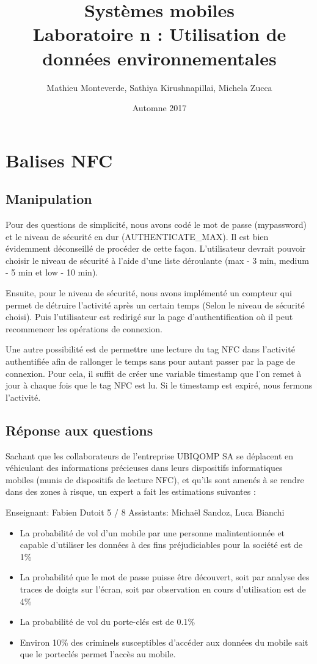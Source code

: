 \documentclass[francais,12pt]{article}
\title{Systèmes mobiles \\ Laboratoire n\textordmasculine3 : Utilisation de données environnementales}
\author{Mathieu Monteverde, Sathiya Kirushnapillai, Michela Zucca}
\date{Automne 2017}
\begin{document}
	
	\maketitle
	
	\setlength{\parskip}{1em}
	
	\section*{Balises NFC}
	\subsection*{Manipulation}
    Pour des questions de simplicité, nous avons codé le mot de passe (mypassword) et le niveau de sécurité en dur (AUTHENTICATE\_MAX). Il est bien évidemment déconseillé de procéder de cette façon. L'utilisateur devrait pouvoir choisir le niveau de sécurité à l'aide d'une liste déroulante (max - 3 min, medium - 5 min et low - 10 min). 
    
    Ensuite, pour le niveau de sécurité, nous avons implémenté un compteur qui permet de détruire l'activité après un certain temps (Selon le niveau de sécurité choisi). Puis l'utilisateur est redirigé sur la page d'authentification où il peut recommencer les opérations de connexion.
    
    Une autre possibilité est de permettre une lecture du tag NFC dans l'activité authentifiée afin de rallonger le temps sans pour autant passer par la page de connexion. Pour cela, il suffit de créer une variable timestamp que l'on remet à jour à chaque fois que le tag NFC est lu. Si le timestamp est expiré, nous fermons l'activité.
    
	\subsection*{Réponse aux questions}
	Sachant que les collaborateurs de l'entreprise UBIQOMP SA se déplacent en véhiculant des informations précieuses dans leurs dispositifs informatiques mobiles (munis de dispositifs de lecture NFC), et qu'ils sont amenés à se rendre dans des zones à risque, un expert a fait les estimations suivantes : 
	
	Enseignant: Fabien Dutoit 5 / 8 Assistants: Michaël Sandoz, Luca Bianchi 
	\begin{itemize}
		\item La probabilité de vol d'un mobile par une personne malintentionnée et capable d'utiliser les données à des fins préjudiciables pour la société est de 1\% 
		\item La probabilité que le mot de passe puisse être découvert, soit par analyse des traces de doigts sur l'écran, soit par observation en cours d'utilisation est de 4\% 
		\item La probabilité de vol du porte-clés est de 0.1\%  
		\item Environ 10\% des criminels susceptibles d'accéder aux données du mobile sait que le porteclés permet l’accès au mobile.
	\end{itemize}
\end{document}
